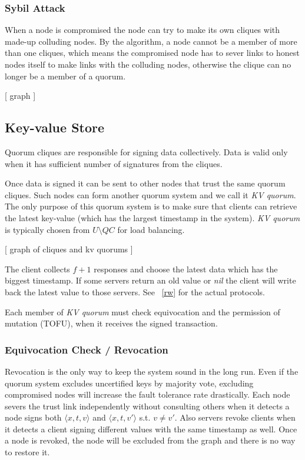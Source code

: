 \subsubsection*{Sybil Attack}
When a node is compromised the node can try to make its own cliques
with made-up colluding nodes. By the algorithm, a node cannot be a
member of more than one cliques, which means the compromised node has
to sever links to honest nodes itself to make links with the colluding
nodes, otherwise the clique can no longer be a member of a quorum.

[ graph ]

\subsection{Key-value Store}
Quorum cliques are responsible for signing data collectively. Data is
valid only when it has sufficient number of signatures from the
cliques. 

Once data is signed it can be sent to other nodes that trust the same
quorum cliques. Such nodes can form another quorum system and we call
it {\em KV quorum}. The only purpose of this quorum system is to make
sure that clients can retrieve the latest key-value (which has the
largest timestamp in the system). {\em KV quorum} is typically chosen
from $U \setminus QC$ for load balancing.

[ graph of cliques and kv quorums ]

The client collects $f + 1$ responses and choose the latest data which
has the biggest timestamp. If some servers return an old value or {\em
  nil} the client will write back the latest value to those
servers.
\ifdefined\ABSTRACT
\else
See ~\ref{rw} for the actual protocols.
\fi

Each member of {\em KV quorum} must check equivocation and the
permission of mutation (TOFU), when it receives the signed
transaction.

\subsubsection*{Equivocation Check / Revocation}
Revocation is the only way to keep the system sound in the long
run. Even if the quorum system excludes uncertified keys by majority
vote, excluding compromised nodes will increase the fault tolerance
rate drastically.
Each node severs the trust link independently without consulting
others when it detects a node signs both $\langle x,t,v \rangle$ and
$\langle x,t,v' \rangle$ s.t.  $v \neq v'$. Also servers revoke
clients when it detects a client signing different values with the
same timestamp as well. Once a node is revoked, the node will be
excluded from the graph and there is no way to restore it.

